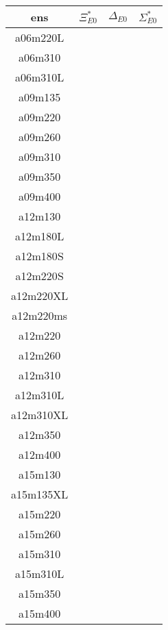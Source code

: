 \documentclass{article}
\begin{document}
\clearpage
\newpage 
\begin{table}[h!]
 \centering
 \setlength{\arrayrulewidth}{0.5mm}
\setlength{\tabcolsep}{13pt}
\renewcommand{\arraystretch}{1}
 \begin{tabular}{|| c | c | c |c ||} 
 \hline
 ens & $\Xi^*_{E0}$ & $\Delta_{E0}$ & $\Sigma^*_{E0}$ \\ [0.8ex] 
 \hline\hline
 a06m220L
  &   &   &  &     \\
 \hline
 a06m310
 &  & & &     \\
 \hline
 a06m310L
  &  & & &     \\
 \hline
 a09m135
  &  & & &     \\
 \hline
 a09m220
  &  & & &     \\
 \hline
 a09m260
  &  & & &     \\
 \hline
 a09m310
  &  & & &     \\
 \hline
 a09m350
  &  & & &     \\
 \hline
 a09m400
  &  & & &     \\
 \hline
 a12m130
  &  & & &     \\
 \hline
 a12m180L
  &  & & &     \\
 \hline
 a12m180S
 &  & & &     \\
 \hline
 a12m220S
  &  & & &     \\
 \hline
 a12m220XL
 &  & & &     \\
 \hline
 a12m220ms
  &  & & &     \\
 \hline
 a12m220
  &  & & &     \\
 \hline
 a12m260
  &  & & &     \\
 \hline
 a12m310
  &  & & &     \\
 \hline
 a12m310L
  &  & & &     \\
 \hline
 a12m310XL
 &  & & &     \\
 \hline
 a12m350
  &  & & &     \\
 \hline
 a12m400
  &  & & &     \\
 \hline
 a15m130
  &  & & &     \\
 \hline
 a15m135XL
  &  & & &     \\
 \hline
 a15m220
  &  & & &     \\
 \hline
 a15m260
  &  & & &     \\
 \hline
 a15m310
  &  & & &     \\
 \hline
 a15m310L
  &  & & &     \\
 \hline
 a15m350
  &  & & &     \\
 \hline
 a15m400
  &  & & &     \\
 \hline
 \end{tabular}
\end{table}
\end{document}
